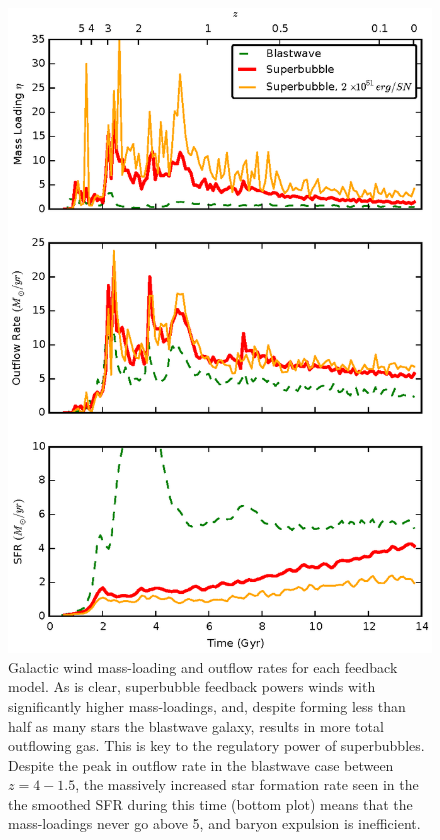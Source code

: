 \begin{figure}
    \includegraphics[width=\columnwidth]{figures2/massloading.eps}
    \caption[Galactic wind mass loading for different feedback models]{Galactic
    wind mass-loading and outflow rates for each feedback model.  As is clear,
    superbubble feedback powers winds with significantly higher mass-loadings,
    and, despite forming less than half as many stars the blastwave galaxy,
    results in more total outflowing gas.  This is key to the regulatory power
    of superbubbles.  Despite the peak in outflow rate in the blastwave case
    between $z=4-1.5$, the massively increased star formation rate seen in the
    the smoothed SFR during this time (bottom plot) means that the mass-loadings
    never go above 5, and baryon expulsion is inefficient.}
    \label{massloading}
\end{figure}
